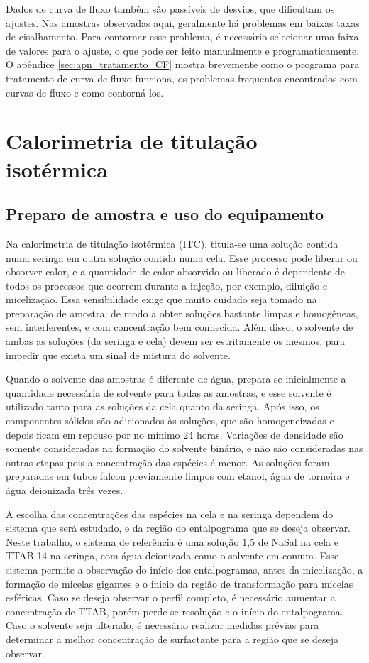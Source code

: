 		Dados de curva de fluxo também são passíveis de desvios, que dificultam os ajustes. Nas amostras observadas aqui, geralmente há problemas em baixas taxas de cisalhamento. Para contornar esse problema, é necessário selecionar uma faixa de valores para o ajuste, o que pode ser feito manualmente e programaticamente. O apêndice \ref{sec:apn_tratamento_CF} mostra brevemente como o programa para tratamento de curva de fluxo funciona, os problemas frequentes encontrados com curvas de fluxo e como contorná-los.
		
	\chapter{Calorimetria de titulação isotérmica}
		\section{Preparo de amostra e uso do equipamento}
		\label{sec:preparo_amostra_itc}
		
		Na calorimetria de titulação isotérmica (ITC), titula-se uma solução contida numa seringa em outra solução contida numa cela. Esse processo pode liberar ou absorver calor, e a quantidade de calor absorvido ou liberado é dependente de todos os processos que ocorrem durante a injeção, por exemplo, diluição e micelização. Essa sensibilidade exige que muito cuidado seja tomado na preparação de amostra, de modo a obter soluções bastante limpas e homogêneas, sem interferentes, e com concentração bem conhecida. Além disso, o solvente de ambas as soluções (da seringa e cela) devem ser estritamente os mesmos, para impedir que exista um sinal de mistura do solvente.
		
		Quando o solvente das amostras é diferente de água, prepara-se inicialmente a quantidade necessária de solvente para todas as amostras, e esse solvente é utilizado tanto para as soluções da cela quanto da seringa. Após isso, os componentes sólidos são adicionados às soluções, que são homogeneizadas e depois ficam em repouso por no mínimo 24 horas. Variações de densidade são somente consideradas na formação do solvente binário, e não são consideradas nas outras etapas pois a concentração das espécies é menor. As soluções foram preparadas em tubos falcon previamente limpos com etanol, água de torneira e água deionizada três vezes.
		
		A escolha das concentrações das espécies na cela e na seringa dependem do sistema que será estudado, e da região do entalpograma que se deseja observar. Neste trabalho, o sistema de referência é uma solução 1,5 \mM{} de NaSal na cela e TTAB 14 \mM{} na seringa, com água deionizada como o solvente em comum. Esse sistema permite a observação do início dos entalpogramas, antes da micelização, a formação de micelas gigantes e o início da região de transformação para micelas esféricas. Caso se deseja observar o perfil completo, é necessário aumentar a concentração de TTAB, porém perde-se resolução e o início do entalpograma. Caso o solvente seja alterado, é necessário realizar medidas prévias para determinar a melhor concentração de surfactante para a região que se deseja observar.
		

